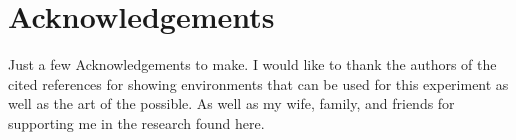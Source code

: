 \section{Acknowledgements}
\label{sec:Acknowledgements}

Just a few Acknowledgements to make. I would like to thank the authors of the cited references for showing environments that can be used for this experiment as well as the art of the possible. As well as my wife, family, and friends for supporting me in the research
found here.